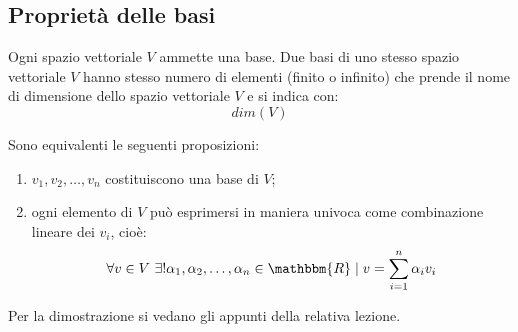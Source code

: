 \documentclass[12pt]{report}
\newcounter{theorem}
\newcounter{proposition}
\begin{document}
\subsection{Proprietà delle basi}
\begin{theorem}{}{}
	Ogni spazio vettoriale $V$ ammette una base. Due basi di uno stesso spazio vettoriale $V$ hanno stesso numero di elementi (finito o infinito) che prende il nome di dimensione dello spazio vettoriale $V$ e si indica con:
	\[
	dim(V)
	\]
\end{theorem}
\begin{proposition}{}{}
Sono equivalenti le seguenti proposizioni:
\begin{enumerate}
	\item $v_1, v_2, \dots, v_n$ costituiscono una base di $V$;
	\item ogni elemento di $V$ può esprimersi in maniera univoca come combinazione lineare dei $v_i$, cioè:
	\[
	\forall v \in V\ \exists! \alpha_1, \alpha_2, \dots, \alpha_n \in \mathbbm{R} \mid v = \displaystyle\sum_{i=1}^{n}\alpha_iv_i
	\]
\end{enumerate}
\end{proposition}
Per la dimostrazione si vedano gli appunti della relativa lezione.
\end{document}
